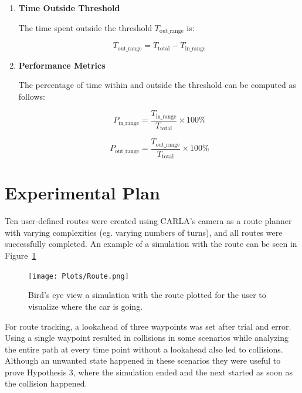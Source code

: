 \documentclass[conference]{IEEEtran}
\begin{document}
\begin{enumerate}
    \item \textbf{Time Outside Threshold}

    The time spent outside the threshold $T_{\text{out\_range}}$ is:

    \begin{equation}
    T_{\text{out\_range}} = T_{\text{total}} - T_{\text{in\_range}}
    \end{equation}

    \item \textbf{Performance Metrics}

    The percentage of time within and outside the threshold can be computed as follows:

    \begin{equation}
    P_{\text{in\_range}} = \frac{T_{\text{in\_range}}}{T_{\text{total}}} \times 100\%
    \end{equation}

    \begin{equation}
    P_{\text{out\_range}} = \frac{T_{\text{out\_range}}}{T_{\text{total}}} \times 100\%
    \end{equation}

\end{enumerate}

\section{Experimental Plan}

Ten user-defined routes were created using CARLA's camera as a route planner with varying complexities (eg. varying numbers of turns), and all routes were successfully completed. An example of a simulation with the route can be seen in Figure~\ref{fig:route}

\begin{figure}[h]
    \centering
    \texttt{[image: Plots/Route.png]}
    \caption{Bird's eye view a simulation with the route plotted for the user to visualize where the car is going.}
    \label{fig:route}
\end{figure}

For route tracking, a lookahead of three waypoints was set after trial and error. Using a single waypoint resulted in collisions in some scenarios while analyzing the entire path at every time point without a lookahead also led to collisions. Although an unwanted state happened in these scenarios they were useful to prove Hypothesis 3, where the simulation ended and the next started as soon as the collision happened.
\end{document}
